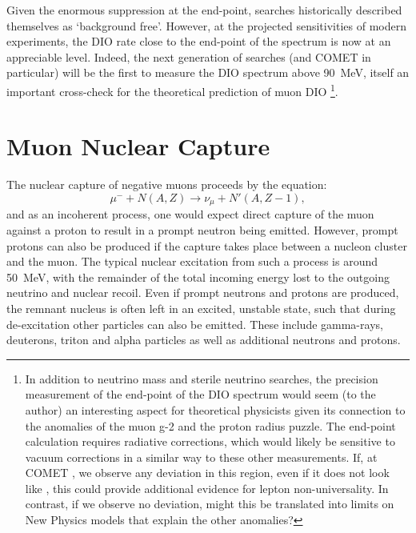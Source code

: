Given the enormous suppression at the end-point, \mueconv searches historically described themselves as `background free'.
However, at the projected sensitivities of modern experiments, the \ac{DIO} rate close to the end-point of the spectrum is now at an appreciable level.
Indeed, the next generation of searches (and COMET \phaseI in particular) will be the first to measure the \ac{DIO} spectrum above 90~MeV, itself an important cross-check for the theoretical prediction of muon \ac{DIO}%
\footnote{In addition to neutrino mass and sterile neutrino searches, the precision measurement of the end-point of the DIO spectrum would seem (to the author) an interesting aspect for theoretical physicists given  its connection to the anomalies of the muon g-2 and the proton radius puzzle.
The end-point calculation requires radiative corrections, which would likely be sensitive to vacuum corrections in a similar way to these other measurements.
If, at COMET \phaseI, we observe any deviation in this region, even if it does not look like \mueconv, this could provide additional evidence for lepton non-universality.
In contrast, if we observe no deviation, might this be translated into limits on New Physics models that explain the other anomalies?}.

\section{Muon Nuclear Capture}
The nuclear capture of negative muons proceeds by the equation:
\begin{equation}
\mu^-+N(A,Z)\rightarrow \nu_\mu+N'(A,Z-1),
\end{equation}
and as an incoherent process, one would expect direct capture of the muon against a proton to result in a prompt neutron being emitted.
However, prompt protons can also be produced if the capture takes place between a nucleon cluster and the muon.
The typical nuclear excitation from such a process is around 50~MeV, with the remainder of the total incoming energy lost to the outgoing neutrino and nuclear recoil.
Even if prompt neutrons and protons are produced, the remnant nucleus is often left in an excited, unstable state, such that during de-excitation other particles can also be emitted.
These include gamma-rays, deuterons, triton and alpha particles as well as additional neutrons and protons.
\FigMuecMuCapture

